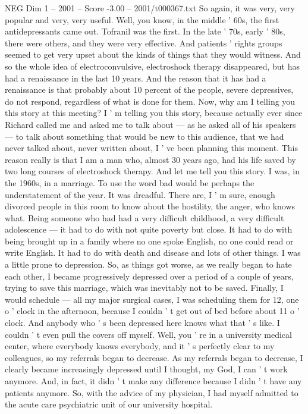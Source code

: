 \begin{textsample}{NEG Dim 1 – 2001 – Score -3.00 – 2001/t000367.txt}
So again, it was very, very popular and very, very useful.
Well, you know, in the middle ' 60s, the first antidepressants came out.
Tofranil was the first.
In the late ' 70s, early ' 80s, there were others, and they were very effective.
And patients ' rights groups seemed to get very upset about the kinds of things that they would witness.
And so the whole idea of electroconvulsive, electroshock therapy disappeared, but has had a renaissance in the last 10 years.
And the reason that it has had a renaissance is that probably about 10 percent of the people, severe depressives, do not respond, regardless of what is done for them.
Now, why am I telling you this story at this meeting?
I ' m telling you this story, because actually ever since Richard called me and asked me to talk about — as he asked all of his speakers — to talk about something that would be new to this audience, that we had never talked about, never written about, I ' ve been planning this moment.
This reason really is that I am a man who, almost 30 years ago, had his life saved by two long courses of electroshock therapy.
And let me tell you this story.
I was, in the 1960s, in a marriage.
To use the word bad would be perhaps the understatement of the year.
It was dreadful.
There are, I ' m sure, enough divorced people in this room to know about the hostility, the anger, who knows what.
Being someone who had had a very difficult childhood, a very difficult adolescence — it had to do with not quite poverty but close.
It had to do with being brought up in a family where no one spoke English, no one could read or write English.
It had to do with death and disease and lots of other things.
I was a little prone to depression.
So, as things got worse, as we really began to hate each other, I became progressively depressed over a period of a couple of years, trying to save this marriage, which was inevitably not to be saved.
Finally, I would schedule — all my major surgical cases, I was scheduling them for 12, one o ' clock in the afternoon, because I couldn ' t get out of bed before about 11 o ' clock.
And anybody who ' s been depressed here knows what that ' s like.
I couldn ' t even pull the covers off myself.
Well, you ' re in a university medical center, where everybody knows everybody, and it ' s perfectly clear to my colleagues, so my referrals began to decrease.
As my referrals began to decrease, I clearly became increasingly depressed until I thought, my God, I can ' t work anymore.
And, in fact, it didn ' t make any difference because I didn ' t have any patients anymore.
So, with the advice of my physician, I had myself admitted to the acute care psychiatric unit of our university hospital.

\end{textsample}
